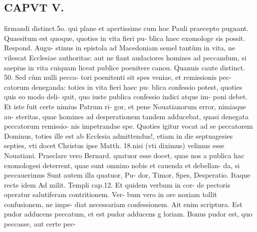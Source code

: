 \documentclass{article}
\begin{document}
\begin{pages}
\section*{CAPVT  V. }\pstart firmandi distinct.5o. qui plane et apertissime cum hoc Pauli praecepto pugnant.  \pend\pstart Quaesitum est quoque, quoties in vita fieri pu- blica haec exomologe sis possit. Respond. Augu- stinus in epistola ad Macedoniam semel tantùm in vita, ne vilescat Ecclesiae authoritas: aut ne fiant audaciores homines ad peccandum, si saepius in vita cuiquam liceat publice poenitere canou. Quanuis caute distinct. 50. Sed cùm nulli pecca- tori poenitenti sit spes veniae, et remissionis pec- catorum deneganda: toties in vita fieri haec pu- blica confessio potest, quoties quis eo modo deli- quit, quo iuste publica confessio indici atque im- poni debet. Et iste fuit certe nimius Patrum ri- gor, et pene Nouatianorum error, nimiaque au- steritas, quae homines ad desperationem tandem adducebat, quasi denegata peccatorum remissio- nis impetrandae spe. Quoties igitur vocat ad se peccatorem Dominus, toties ille est ab Ecclesia admittendus!, etiam in die septuagesies septies, vti docet Christus ipse Matth. 18.nisi (vti diximus) velimus esse Nouatiani.  \pend\pstart Praeclare vero Bernard. quatuor esse docet, quae nos a publica hac exomologesi deterrent, quae sunt omnino nobis et cauenda et debellan- da, si peccauerimus Sunt autem illa quatuor, Pu- dor, Timor, Spes, Desperatio. Itaque recte idem Ad milit. Templi cap.12. Et quidem verbum in cor- de pectoris operatur salutiferam contritionem. Ver- bum vero in ore noxiam tollit confusionem, ne impe- diat necessariam confessionem. Ait enim scriptura. Est pudor adducens peccatum, et est pudor adducens g loriam. Bonus pudor est, quo peccasse, aut certe pec-  \pend

\end{pages}
\end{document}
